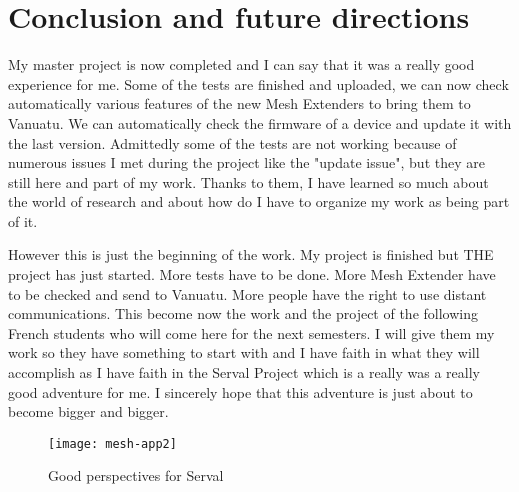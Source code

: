 \chapter{Conclusion and future directions}

My master project is now completed and I can say that it was a really good experience for me. Some of the tests are finished and uploaded, we can now check automatically various features of the new Mesh Extenders to bring them to Vanuatu. We can automatically check the firmware of a device and update it with the last version. Admittedly some of the tests are not working because of numerous issues I met during the project like the "update issue", but they are still here and part of my work. Thanks to them, I have learned so much about the world of research and about how do I have to organize my work as being part of it. 

\par
However this is just the beginning of the work. My project is finished but THE project has just started. More tests have to be done. More Mesh Extender have to be checked and send to Vanuatu. More people have the right to use distant communications. This become now the work and the project of the following French students who will come here for the next semesters. I will give them my work so they have something to start with and I have faith in what they will accomplish as I have faith in the Serval Project which is a really was a really good adventure for me. I sincerely hope that this adventure is just about to become bigger and bigger. 

\begin{figure}[h]
\centering
\texttt{[image: mesh-app2]}
\caption{Good perspectives for Serval}
\end{figure}